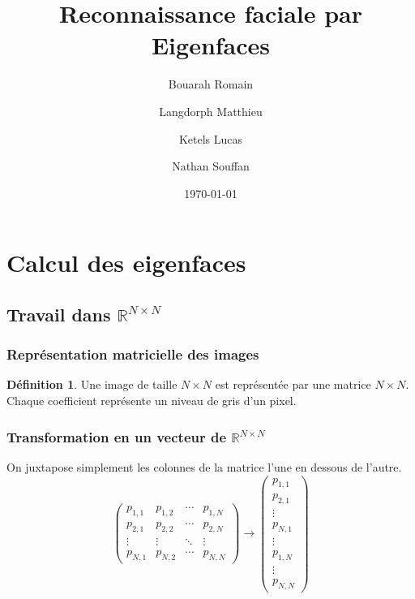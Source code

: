 \documentclass{beamer}
\title{Reconnaissance faciale par Eigenfaces}
\author{Bouarah Romain \and Langdorph Matthieu \and Ketels Lucas \and Nathan Souffan }
\date{\today}
\theoremstyle{plain}
\theoremstyle{definition}
\newtheorem{defi}{Définition}
\begin{document}
\begin{frame}[plain]
  \titlepage
\end{frame}


\begin{frame}[plain]
  \tableofcontents
\end{frame}

\section{Calcul des eigenfaces}
\subsection{Travail dans $\mathbb{R}^{N \times N}$}
\begin{frame}
  \frametitle{Représentation matricielle des images}
  \begin{defi}
    Une image de taille $N \times N$ est représentée par une matrice $N \times N$.\\
    Chaque coefficient représente un niveau de gris d'un pixel.
  \end{defi}
\end{frame}



\begin{frame}
  \frametitle{Transformation en un vecteur de $\mathbb{R}^{N \times N}$}
  On juxtapose simplement les colonnes de la matrice l'une en dessous de l'autre.
  \[
    \begin{pmatrix}
      p_{1,1} & p_{1,2} & \cdots & p_{1,N} \\
      p_{2,1} & p_{2,2} & \cdots & p_{2,N} \\
      \vdots  & \vdots  & \ddots & \vdots  \\
      p_{N,1} & p_{N,2} & \cdots & p_{N,N}
    \end{pmatrix}
    \rightarrow
    \begin{pmatrix}
      p_{1,1} \\
      p_{2,1} \\
      \vdots \\
      p_{N,1} \\
      \vdots \\
      p_{1,N} \\
      \vdots \\
      p_{N,N}
    \end{pmatrix}
  \]  
\end{frame}
\end{document}
